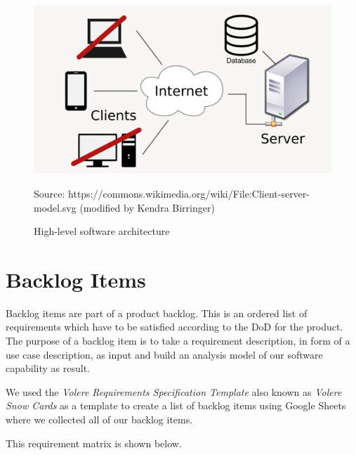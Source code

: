\documentclass[a4paper, 12pt]{article}
\newcommand{\source}[1]{\caption*{Source: {#1}}}
\begin{document}
\newpage
\begin{figure} [htbp]
  \begin{center}
    \includegraphics[scale=0.2]{images/high-level-system-architecture.jpg}
  \end{center}
  \caption{High-level software architecture}
  \label{fig:software-archi}
  \source{https://commons.wikimedia.org/wiki/File:Client-server-model.svg (modified by Kendra Birringer)}
\end{figure}
\section{Backlog Items}
Backlog items are part of a product backlog. This is an ordered list of requirements which have to be satisfied according to the DoD for the product. The purpose of a backlog item is to take a requirement description, in form of a use case description, as input and build an analysis model of our software capability as result.

We used the \emph{Volere Requirements Specification Template} \cite{volere} also known as \emph{Volere Snow Cards}  as a template to create a list of backlog items using Google Sheets where we collected all of our backlog items.

This requirement matrix is shown below.


\end{document}
